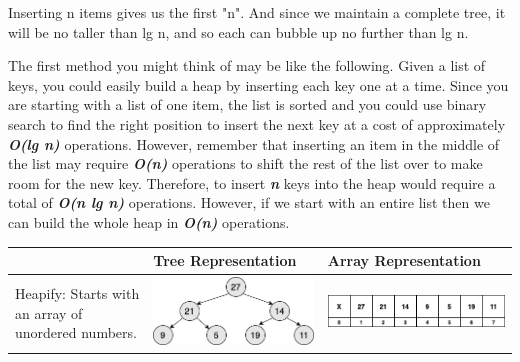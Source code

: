 Inserting n items gives us the first "n". And since we maintain a complete tree, it will be no taller than lg n, and so each can bubble up no further than lg n. 

The first method you might think of may be like the following. Given a list of keys, you could easily build a heap by inserting each key one at a time. Since you are starting with a list of one item, the list is sorted and you could use binary search to find the right position to insert the next key at a cost of approximately \textbf{\emph{O(lg n)}} operations. However, remember that inserting an item in the middle of the list may require \textbf{\emph{O(n)}} operations to shift the rest of the list over to make room for the new key. Therefore, to insert \textbf{\emph{n}} keys into the heap would require a total of \textbf{\emph{O(n lg n)}} operations. However, if we start with an entire list then we can build the whole heap in \textbf{\emph{O(n)}} operations.

\begin{center}
	\begin{table}
		\begin{tabular}{| p{}|M{0.30\textwidth}|M{0.35\textwidth}|}
			\hline
			  & Tree Representation & Array Representation \\
			\hline
			\scriptsize{Heapify: Starts with an array of unordered numbers.}
			&
			\includegraphics[scale=.30]{images/heapify_tree_01.png}
			&   
			\includegraphics[scale=.30]{images/heapify_01.png}\\
			\hline
		\end{tabular}
	\end{table}
\end{center}

